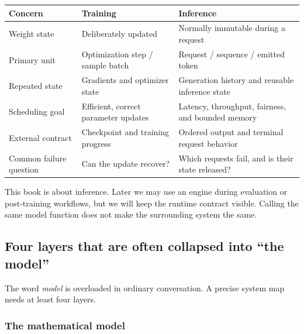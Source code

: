 \documentclass[
  10pt,
]{article}
\newcounter{none} %
\begin{document}
{\def\LTcaptype{none} %
\begin{longtable}[]{@{}
  >{\raggedright\arraybackslash}p{}
  >{\raggedright\arraybackslash}p{}
  >{\raggedright\arraybackslash}p{}@{}}
\toprule\noalign{}
\begin{minipage}[b]{\linewidth}\raggedright
Concern
\end{minipage} & \begin{minipage}[b]{\linewidth}\raggedright
Training
\end{minipage} & \begin{minipage}[b]{\linewidth}\raggedright
Inference
\end{minipage} \\
\midrule\noalign{}
\endhead
\bottomrule\noalign{}
\endlastfoot
Weight state & Deliberately updated & Normally immutable during a
request \\
Primary unit & Optimization step / sample batch & Request / sequence /
emitted token \\
Repeated state & Gradients and optimizer state & Generation history and
reusable inference state \\
Scheduling goal & Efficient, correct parameter updates & Latency,
throughput, fairness, and bounded memory \\
External contract & Checkpoint and training progress & Ordered output
and terminal request behavior \\
Common failure question & Can the update recover? & Which requests fail,
and is their state released? \\
\end{longtable}
}

This book is about inference. Later we may use an engine during
evaluation or post-training workflows, but we will keep the runtime
contract visible. Calling the same model function does not make the
surrounding system the same.

\subsection{Four layers that are often collapsed into ``the
model''}\label{four-layers-that-are-often-collapsed-into-the-model}

The word \emph{model} is overloaded in ordinary conversation. A precise
system map needs at least four layers.

\subsubsection{The mathematical model}\label{the-mathematical-model}
\end{document}

